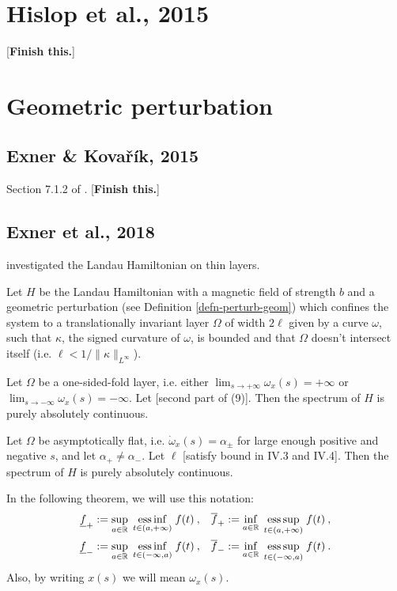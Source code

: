 \section{Hislop et al., 2015}
\cite{Hislop2015} [\textbf{Finish this.}]




\section{Geometric perturbation}

\subsection{Exner \& Kovařík, 2015}
Section 7.1.2 of \cite{ExnerKovarik2015}. [\textbf{Finish this.}]

\subsection{Exner et al., 2018}
\cite{Exner2018} investigated the Landau Hamiltonian on thin layers.

\begin{defn}
    Let $H\!$ be the Landau Hamiltonian with a magnetic field of strength $b$ and a geometric perturbation (see Definition \ref{defn-perturb-geom}) which confines the system to a translationally invariant layer $\Omega$ of width $2\ell$ given by a curve $\omega$, such that $\kappa$, the signed curvature of $\omega$, is bounded and that $\Omega$ doesn't intersect itself (i.e. $\ell < 1/\lVert\kappa\rVert_{L^\infty}$).
\end{defn}

\begin{thm}
    Let $\Omega$ be a one-sided-fold layer, i.e. either $\lim_{s \to {+\infty}} \omega_x(s) = +\infty$ or $\lim_{s \to {-\infty}} \omega_x(s) = -\infty$. Let [second part of (9)]. Then the spectrum of $H$ is purely absolutely continuous.
\end{thm}

\begin{thm}
    Let $\Omega$ be asymptotically flat, i.e. $\dot{\omega}_x(s) = \alpha_\pm$ for large enough positive and negative $s$, and let $\alpha_+ \neq \alpha_-$. Let $\ell$ [satisfy bound in IV.3 and IV.4]. Then the spectrum of $H$ is purely absolutely continuous.
\end{thm}

In the following theorem, we will use this notation:
\begin{align*}
    \underline{f}_+ &:= \sup_{a \in \mathbb{R}} \; \underset{t\in(a, +\infty)}{\operatorname{ess \, inf}} \; f(t) \: ,&
    \overline{f}_+ &:= \inf_{a \in \mathbb{R}} \; \underset{t\in(a, +\infty)}{\operatorname{ess \, sup}} \; f(t) \: ,\\
    \underline{f}_- &:= \sup_{a \in \mathbb{R}} \; \underset{t\in(-\infty, a)}{\operatorname{ess \, inf}} \; f(t) \: , &
    \overline{f}_- &:= \inf_{a \in \mathbb{R}} \; \underset{t\in(-\infty, a)}{\operatorname{ess \, sup}} \; f(t) \: .
\end{align*}
Also, by writing $x(s)$ we will mean $\omega_x(s)$.

